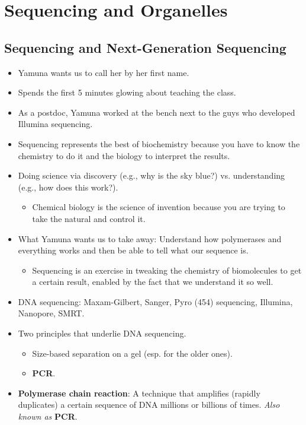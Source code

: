 \documentclass[../notes.tex]{subfiles}
\begin{document}
\chapter{Sequencing and Organelles}
\section{Sequencing and Next-Generation Sequencing}
\begin{itemize}
    \item {}Yamuna wants us to call her by her first name.
    \item Spends the first 5 minutes glowing about teaching the class.
    \item As a postdoc, Yamuna worked at the bench next to the guys who developed Illumina sequencing.
    \item Sequencing represents the best of biochemistry because you have to know the chemistry to do it and the biology to interpret the results.
    \item Doing science via discovery (e.g., why is the sky blue?) vs. understanding (e.g., how does this work?).
    \begin{itemize}
        \item Chemical biology is the science of invention because you are trying to take the natural and control it.
    \end{itemize}
    \item What Yamuna wants us to take away: Understand how polymerases and everything works and then be able to tell what our sequence is.
    \begin{itemize}
        \item Sequencing is an exercise in tweaking the chemistry of biomolecules to get a certain result, enabled by the fact that we understand it so well.
    \end{itemize}
    \item DNA sequencing: Maxam-Gilbert, Sanger, Pyro (454) sequencing, Illumina, Nanopore, SMRT.
    \item Two principles that underlie DNA sequencing.
    \begin{itemize}
        \item Size-based separation on a gel (esp. for the older ones).
        \item \textbf{PCR}.
    \end{itemize}
    \item \textbf{Polymerase chain reaction}: A technique that amplifies (rapidly duplicates) a certain sequence of DNA millions or billions of times. \emph{Also known as} \textbf{PCR}.

\end{itemize}
\end{document}
